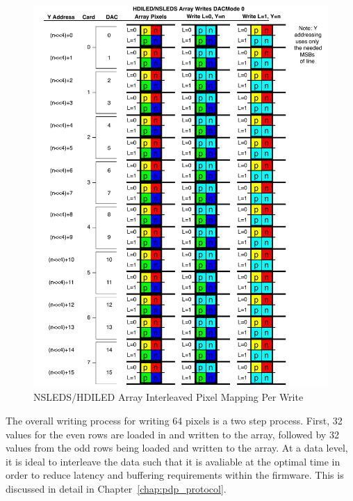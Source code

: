     \begin{figure}
        \centering
        \includegraphics[trim=0in 0.3in 0in 0in,width=1.0\textwidth]{fig/nsleds_hdiled_array_writing.pdf}
        \caption{NSLEDS/HDILED Array Interleaved Pixel Mapping Per Write}
        \label{fig:nsleds_hdiled_array_interleaved_pixel_mapping_per_write}
    \end{figure}

    The overall writing process for writing 64 pixels is a two step process. First, 32 values for the even rows are loaded in and written to the array, followed by 32 values from the odd rows being loaded and written to the array. At a data level, it is ideal to interleave the data such that it is avaliable at the optimal time in order to reduce latency and buffering requirements within the firmware. This is discussed in detail in Chapter~\ref{chap:pdp_protocol}.


